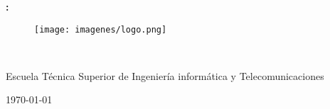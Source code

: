 \documentclass{memoria}
\begin{document}
\pagestyle{empty} %


\begin{center}
\LARGE{\bf \thetitle:}\\
\end{center}





\begin{figure}[H]
\centering
\texttt{[image: imagenes/logo.png]}
\end{figure}


\begin{center}
\theauthor
\\
\end{center}

\begin{center}
Escuela Técnica Superior de Ingeniería informática y Telecomunicaciones

\end{center}


\begin{center}
\today
\end{center}






\newpage

%
%



\nocite{*}

%
\end{document}
